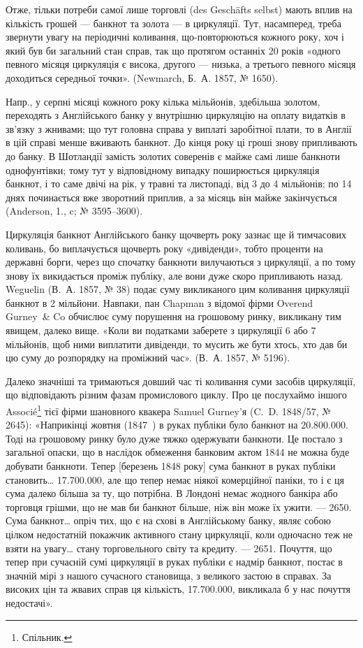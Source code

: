 Отже, тільки потреби самої лише торговлі (des Geschäfts selbst) мають
вплив на кількість грошей — банкнот та золота — в циркуляції. Тут, насамперед,
треба звернути увагу на періодичні коливання, що-повторюються кожного року,
хоч і який був би загальний стан справ, так що протягом останніх 20 років
«одного певного місяця циркуляція є висока, другого — низька, а третього певного
місяця доходиться середньої точки». (Newmarch, Б.~А. 1857, № 1650).

Напр., у серпні місяці кожного року кілька мільйонів, здебільша золотом,
переходять з Англійського банку у внутрішню циркуляцію на оплату видатків
в зв’язку з жнивами; що тут головна справа у виплаті заробітної плати, то
в Англії в цій справі менше вживають банкнот. До кінця року ці гроші знову
припливають до банку. В Шотландії замість золотих соверенів є майже самі лише
банкноти однофунтівки; тому тут у відповідному випадку поширюється циркуляція
банкнот, і то саме двічі на рік, у травні та листопаді, від 3 до 4 мільйонів;
по 14 днях починається вже зворотний приплив, а за місяць він майже закінчується
(Anderson, 1., c; № 3595--3600).

Циркуляція банкнот Англійського банку щочверть року зазнає ще й
тимчасових коливань, бо виплачується щочверть року «дивіденди», тобто проценти
на державні борги, через що спочатку банкноти вилучаються з циркуляції,
а по тому знову їх викидається проміж публіку, але вони дуже скоро припливають
назад. Weguelin (В.~А. 1857, № 38) подає суму викликаного цим коливання
циркуляції банкнот в 2 мільйони. Навпаки, пан Chapman з відомої фірми
Overend Gurney~\& Co обчислює суму порушення на грошовому ринку, викликану
тим явищем, далеко вище. «Коли ви податками заберете з циркуляції 6 або
7 мільйонів, щоб ними виплатити дивіденди, то мусить же бути хтось, хто дав
би цю суму до розпорядку на проміжний час». (В.~А. 1857, № 5196).

Далеко значніші та тримаються довший час ті коливання суми засобів
циркуляції, що відповідають різним фазам промислового циклу. Про це послухаймо
іншого Associé\footnote*{
Спільник. 
} тієї фірми шановного квакера Samuel Gurney’я (C.~D.
1848/57, № 2645): «Наприкінці жовтня (1847~) в руках публіки було банкнот
на \num{20.800.000}. Тоді на грошовому ринку було дуже тяжко одержувати
банкноти. Це постало з загальної опаски, що в наслідок обмеження банковим
актом 1844 не можна буде добувати банкноти. Тепер [березень 1848 року] сума
банкнот в руках публіки становить\dots{} \num{17.700.000}, але що тепер немає
ніякої комерційної паніки, то і є ця сума далеко більша за ту, що потрібна.
В Лондоні немає жодного банкіра або торговця грішми, що не мав би банкнот
більше, ніж він може їх ужити. — 2650. Сума банкнот\dots{} опріч тих, що є на
схові в Англійському банку, являє собою цілком недостатній покажчик активного
стану циркуляції, коли одночасно теж не взяти на увагу\dots{} стану торговельного
світу та кредиту. — 2651. Почуття, що тепер при сучасній сумі циркуляції в
руках публіки є надмір банкнот, постає в значній мірі з нашого сучасного становища,
з великого застою в справах. За високих цін та жвавих справ ця
кількість, \num{17.700.000}, викликала б у нас почуття недостачі».
